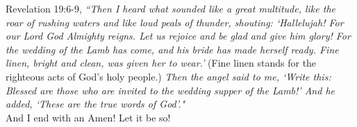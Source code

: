 \documentclass[oneside,12pt]{book}
\begin{document}
Revelation 19:6-9, \textit{``Then I heard what sounded like a great multitude, like the roar of rushing waters and like loud peals of thunder, shouting: `Hallelujah! For our Lord God Almighty reigns. Let us rejoice and be glad and give him glory! For the wedding of the Lamb has come, and his bride has made herself ready. Fine linen, bright and clean, was given her to wear.'} (Fine linen stands for the righteous acts of God's holy people.) \textit{Then the angel said to me, `Write this: Blessed are those who are invited to the wedding supper of the Lamb!' And he added, `These are the true words of God'."}\\

And I end with an Amen! Let it be so!

\clearpage
\backmatter
\thispagestyle{plain}
\begin{minipage}{\linewidth}
\end{minipage}\\
\clearpage
\end{document}
